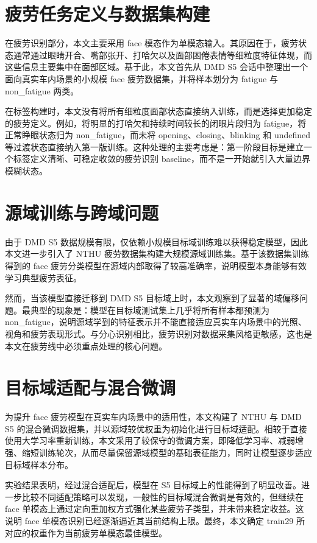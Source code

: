 \documentclass[12pt]{ctexrep}
\begin{document}
\section{疲劳任务定义与数据集构建}
在疲劳识别部分，本文主要采用 face 模态作为单模态输入。其原因在于，疲劳状态通常通过眼睛开合、嘴部张开、打哈欠以及面部困倦表情等细粒度特征体现，而这些信息主要集中在面部区域。基于此，本文首先从 DMD S5 会话中整理出一个面向真实车内场景的小规模 face 疲劳数据集，并将样本划分为 fatigue 与 non\_fatigue 两类。

在标签构建时，本文没有将所有细粒度面部状态直接纳入训练，而是选择更加稳定的疲劳定义。例如，将明显的打哈欠和持续时间较长的闭眼片段归为 fatigue，将正常睁眼状态归为 non\_fatigue，而未将 opening、closing、blinking 和 undefined 等过渡状态直接纳入第一版训练。这种处理的主要考虑是：第一阶段目标是建立一个标签定义清晰、可稳定收敛的疲劳识别 baseline，而不是一开始就引入大量边界模糊状态。

\section{源域训练与跨域问题}
由于 DMD S5 数据规模有限，仅依赖小规模目标域训练难以获得稳定模型，因此本文进一步引入了 NTHU 疲劳数据集构建大规模源域训练集。基于该数据集训练得到的 face 疲劳分类模型在源域内部取得了较高准确率，说明模型本身能够有效学习典型疲劳表征。

然而，当该模型直接迁移到 DMD S5 目标域上时，本文观察到了显著的域偏移问题。最典型的现象是：模型在目标域测试集上几乎将所有样本都预测为 non\_fatigue，说明源域学到的特征表示并不能直接适应真实车内场景中的光照、视角和疲劳表现形式。与分心识别相比，疲劳识别对数据采集风格更敏感，这也是本文在疲劳线中必须重点处理的核心问题。

\section{目标域适配与混合微调}
为提升 face 疲劳模型在真实车内场景中的适用性，本文构建了 NTHU 与 DMD S5 的混合微调数据集，并以源域较优权重为初始化进行目标域适配。相较于直接使用大学习率重新训练，本文采用了较保守的微调方案，即降低学习率、减弱增强、缩短训练轮次，从而尽量保留源域模型的基础表征能力，同时让模型逐步适应目标域样本分布。

实验结果表明，经过混合适配后，模型在 S5 目标域上的性能得到了明显改善。进一步比较不同适配策略可以发现，一般性的目标域混合微调是有效的，但继续在 face 单模态上通过定向重加权方式强化某些疲劳子类型，并未带来稳定收益。这说明 face 单模态识别已经逐渐逼近其当前结构上限。最终，本文确定 train29 所对应的权重作为当前疲劳单模态最佳模型。
\end{document}
